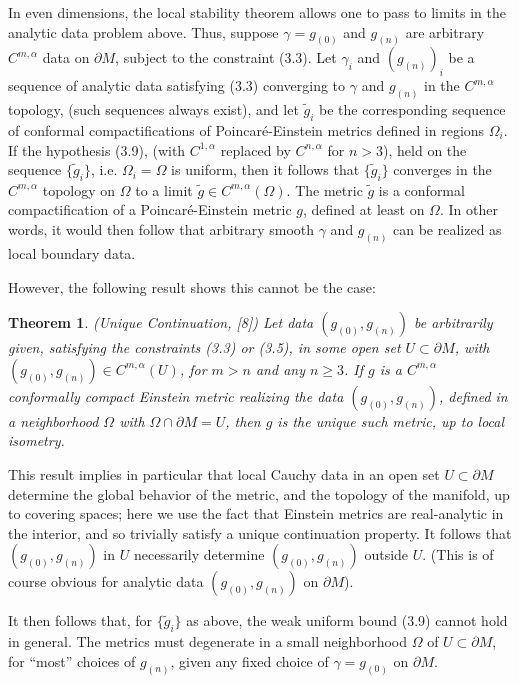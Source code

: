 \documentclass[11pt,amsfonts]{amsart}
\newtheorem{theorem}{Theorem}[section]
\begin{document}
 In even dimensions, the local stability theorem allows one to pass to 
limits in the analytic data problem above. Thus, suppose $\gamma  = 
g_{(0)}$ and $g_{(n)}$ are arbitrary $C^{m,\alpha}$ data on $\partial M$, 
subject to the constraint (3.3). Let $\gamma_{i}$ and 
$(g_{(n)})_{i}$ be a sequence of analytic data satisfying (3.3) 
converging to $\gamma$ and $g_{(n)}$ in the $C^{m,\alpha}$ topology, 
(such sequences always exist), and let $\widetilde g_{i}$ be the 
corresponding sequence of conformal compactifications of 
Poincar\'e-Einstein metrics defined in regions $\Omega_{i}$. If the 
hypothesis (3.9), (with $C^{1,\alpha}$ replaced by $C^{n,\alpha}$ for 
$n > 3$), held on the sequence $\{\widetilde g_{i}\}$, i.e. 
$\Omega_{i} = \Omega$ is uniform, then it follows that 
$\{\widetilde g_{i}\}$ converges in the $C^{m,\alpha}$ topology on 
$\Omega$ to a limit $\widetilde g \in  C^{m,\alpha}(\Omega )$. The metric 
$\widetilde g$ is a conformal compactification of a Poincar\'e-Einstein 
metric $g$, defined at least on $\Omega$. In other words, it would then 
follow that arbitrary smooth $\gamma$ and $g_{(n)}$ can be realized as 
local boundary data.

 However, the following result shows this cannot be the case:

\begin{theorem} \label{t 3.3.} {\rm (Unique Continuation, [8])}
   Let data $(g_{(0)}, g_{(n)})$ be arbitrarily given, satisfying the 
constraints (3.3) or (3.5), in some open set $U \subset \partial M$, 
with $(g_{(0)}, g_{(n)}) \in C^{m,\alpha}(U)$, for $m > n$ and any 
$n \geq 3$. If $g$ is a $C^{m,\alpha}$ conformally compact Einstein 
metric realizing the data $(g_{(0)}, g_{(n)})$, defined in a neighborhood 
$\Omega$ with $\Omega\cap\partial M = U$, then $g$ is the unique such 
metric, up to local isometry. 
\end{theorem}

 This result implies in particular that local Cauchy data in an open 
set $U \subset \partial M$ determine the global behavior of the 
metric, and the topology of the manifold, up to covering spaces; here 
we use the fact that Einstein metrics are real-analytic in the 
interior, and so trivially satisfy a unique continuation property. 
It follows that $(g_{(0)}, g_{(n)})$ in $U$ necessarily determine 
$(g_{(0)}, g_{(n)})$ outside $U$. (This is of course obvious for analytic 
data $(g_{(0)}, g_{(n)})$ on $\partial M$).

 It then follows that, for $\{\widetilde g_{i}\}$ as above, the weak 
uniform bound (3.9) cannot hold in general. The metrics must degenerate 
in a small neighborhood $\Omega$ of $U\subset \partial M$, for ``most'' 
choices of $g_{(n)}$, given any fixed choice of $\gamma = g_{(0)}$ on 
$\partial M$. 
\end{document}
